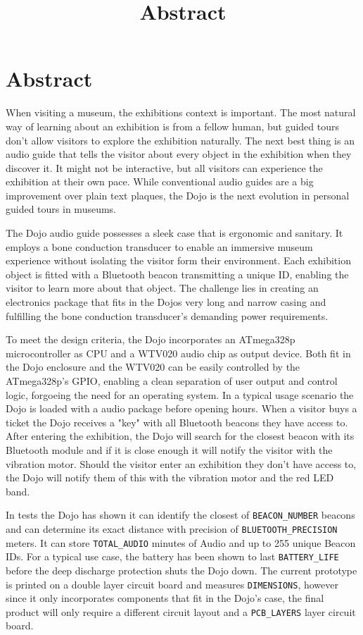 \documentclass[a4paper]{article}
\title{Abstract}
\begin{document}
\section*{Abstract}

When visiting a museum, the exhibitions context is important.
The most natural way of learning about an exhibition is from a fellow human, 
	but guided tours don't allow visitors to explore the exhibition naturally.
The next best thing is an audio guide that tells the visitor about every object in the exhibition when they discover it.
It might not be interactive, but all visitors can experience the exhibition at their own pace.
While conventional audio guides are a big improvement over plain text plaques,
	the Dojo is the next evolution in personal guided tours in museums.

The Dojo audio guide possesses a sleek case that is ergonomic and sanitary.
It employs a bone conduction transducer to enable an immersive museum experience 
	without isolating the visitor form their environment.
Each exhibition object is fitted with a Bluetooth beacon transmitting a unique ID, 
	enabling the visitor to learn more about that object.
The challenge lies in creating an electronics package that fits in the Dojos very long and narrow casing
	and fulfilling the bone conduction transducer's demanding power requirements.

To meet the design criteria, the Dojo incorporates an ATmega328p microcontroller as CPU
	and a WTV020 audio chip as output device.
Both fit in the Dojo enclosure and the WTV020 can be easily controlled by the ATmega328p's GPIO, 
	enabling a clean separation of user output and control logic, forgoeing the need for an operating system.
In a typical usage scenario the Dojo is loaded with a audio package before opening hours.
When a visitor buys a ticket the Dojo receives a "key" with all Bluetooth beacons they have access to.
After entering the exhibition, the Dojo will search for the closest beacon with its Bluetooth module
	and if it is close enough it will notify the visitor with the vibration motor.
Should the visitor enter an exhibition they don't have access to, 
	the Dojo will notify them of this with the vibration motor and the red LED band.

In tests the Dojo has shown it can identify the closest of \texttt{BEACON\_NUMBER} beacons
	and can determine its exact distance with precision of \texttt{BLUETOOTH\_PRECISION} meters.
It can store \texttt{TOTAL\_AUDIO} minutes of Audio and up to 255 unique Beacon IDs.
For a typical use case, the battery has been shown to last \texttt{BATTERY\_LIFE}
	before the deep discharge protection shuts the Dojo down.
The current prototype is printed on a double layer circuit board and measures \texttt{DIMENSIONS}, 
	however since it only incorporates components that fit in the Dojo's case, 
	the final product will only require a different circuit layout and a \texttt{PCB\_LAYERS} layer circuit board.
\end{document}
